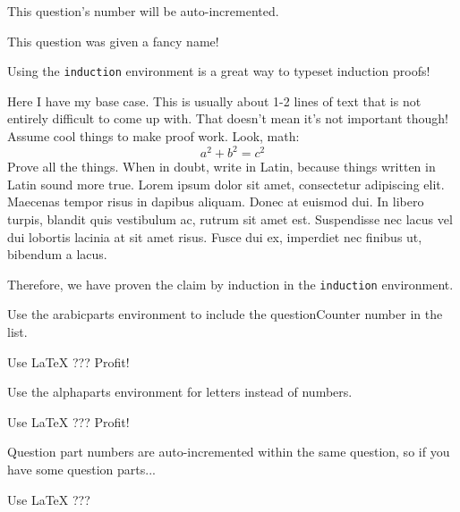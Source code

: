 \documentclass[11pt,largemargins]{homework}
\begin{document}
\question
  This question's number will be auto-incremented.

  \lipsum[2]

  This question was given a fancy name!

  \lipsum[3]

\newpage
\question
  Using the \texttt{induction} environment is a great way to typeset induction proofs!
  \begin{induction}
    \basecase
      Here I have my base case.
      This is usually about 1-2 lines of text that is not entirely difficult to come up with.
      That doesn't mean it's not important though!
    \indhyp
      Assume cool things to make proof work. Look, math:
      \[a^2 + b^2 = c^2\]
    \indstep
      Prove all the things.  When in doubt, write in Latin, because things
      written in Latin sound more true.  Lorem ipsum dolor sit amet, consectetur
      adipiscing elit. Maecenas tempor risus in dapibus aliquam. Donec at
      euismod dui. In libero turpis, blandit quis vestibulum ac, rutrum sit amet
      est. Suspendisse nec lacus vel dui lobortis lacinia at sit amet risus.
      Fusce dui ex, imperdiet nec finibus ut, bibendum a lacus.
  \end{induction}

  Therefore, we have proven the claim by induction in the \texttt{induction} environment.

\question
  Use the arabicparts environment to include the questionCounter number in the list.
  \begin{arabicparts}
    \questionpart Use \LaTeX
    \questionpart ???
    \questionpart Profit!
  \end{arabicparts}

  \lipsum[7]

\question
  Use the alphaparts environment for letters instead of numbers.
  \begin{alphaparts}
    \questionpart
      Use \LaTeX
    \questionpart ???
    \questionpart Profit!
  \end{alphaparts}

\question
    Question part numbers are auto-incremented within the same question, so if you have some question parts...

    \begin{alphaparts}
        \questionpart
            Use \LaTeX
        \questionpart ???
    \end{alphaparts}
\end{document}
